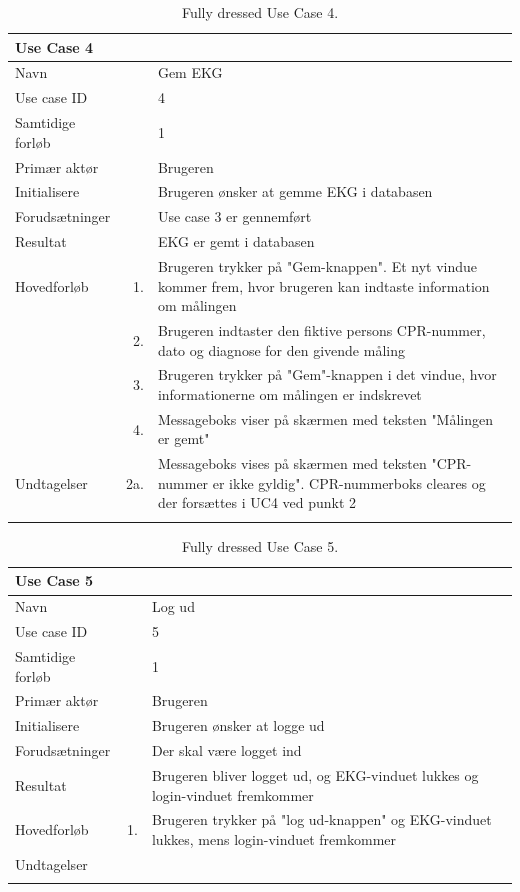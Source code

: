 \begin{longtabu} to  %
    {\large \textbf{Use Case 4}} && \\
    \toprule
    Navn &&    Gem EKG\\
    Use case ID &&    4\\
    Samtidige forløb &&    1\\
    Primær aktør &&    Brugeren\\
    Initialisere &&    Brugeren ønsker at gemme EKG i databasen\\
    Forudsætninger &&  Use case 3 er gennemført\\
    Resultat &&    EKG er gemt i databasen                    \\ \midrule
    Hovedforløb &    1. &    Brugeren trykker på "Gem-knappen". Et nyt vindue kommer frem, hvor brugeren kan indtaste information om målingen\\[-1ex]   						 	
                &    2. &	Brugeren indtaster den fiktive persons CPR-nummer, dato og diagnose for den givende måling\\[-1ex]  
                
                &	3.	&	Brugeren trykker på "Gem"-knappen i det vindue, hvor informationerne om målingen er indskrevet\\[-1ex]	
                	              	
                &	4. &		Messageboks viser på skærmen med teksten "Målingen er gemt" \\ \midrule
                
    Undtagelser &    2a. & Messageboks vises på skærmen med teksten "CPR-nummer er ikke gyldig". CPR-nummerboks cleares og der forsættes i UC4 ved punkt 2     \\ \bottomrule
\caption{Fully dressed Use Case 4.}
\label{UC4}
\end{longtabu}

\begin{longtabu} to  %
    {\large \textbf{Use Case 5}} && \\
    \toprule
    Navn &&    Log ud\\
    Use case ID &&    5\\
    Samtidige forløb &&    1\\
    Primær aktør &&    Brugeren\\
    Initialisere &&    Brugeren ønsker at logge ud\\
    Forudsætninger &&  Der skal være logget ind\\
    Resultat &&    Brugeren bliver logget ud, og EKG-vinduet lukkes og login-vinduet fremkommer                     \\ \midrule
    Hovedforløb &    1. &    Brugeren trykker på "log ud-knappen" og EKG-vinduet lukkes, mens login-vinduet fremkommer 
    \\ \midrule
    Undtagelser & &
         \\ \bottomrule
\caption{Fully dressed Use Case 5.}
\label{UC5}
\end{longtabu}

